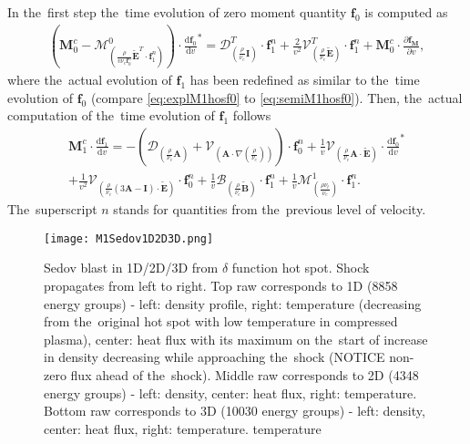 \documentclass[review]{elsarticle}
\newcommand{\pdv}[2]{\frac{\partial{#1}}{\partial{#2}}}
\newcommand{\vect}[1]{\boldsymbol{#1}}
\newcommand{\matr}[1]{\mathbf{#1}}
\newcommand{\dI}{\text{d}}
\newcommand{\odv}[2]{\frac{\dI #1}{\dI #2}}
\newcommand{\ddv}[2]{\odv{#1}{#2}}
\newcommand{\nue}{\nu_{e}}
\newcommand{\nutot}{\nu_{t}}
\newcommand{\vmag}{v}
\newcommand{\tE}{\vect{\tilde{E}}}
\newcommand{\tB}{\vect{\tilde{B}}}
\newcommand{\fM}{f_M}
\newcommand{\vfzero}{\vect{f}_0}
\newcommand{\fone}{\vect{f}_1}
\newcommand{\MI}{\matr{I}}
\newcommand{\MA}{\matr{A}}
\newcommand{\IM}{\boldsymbol{\mathcal{M}}}
\newcommand{\ID}{\boldsymbol{\mathcal{D}}}
\newcommand{\IV}{\boldsymbol{\mathcal{V}}}
\newcommand{\IB}{\boldsymbol{\mathcal{B}}}
\begin{document}
In the~first step the~time evolution of zero moment quantity $\vfzero$ is 
computed as
\begin{multline}
  \left( \matr{M}^c_0 
  - \IM^0_{\left(\frac{\rho}{\vmag\nue\vfzero^n}\tE^T\cdot\fone^n\right)}
  \right) \cdot {\ddv{\vfzero}{\vmag}}^* 
  = 
  \ID^T_{\left(\frac{\rho}{\nue}\MI\right)} \cdot \fone^n 
  + \frac{2}{\vmag^2}\IV^T_{\left(\frac{\rho}{\nue}\tE\right)} \cdot \fone^n
  + \matr{M}^c_0 \cdot \pdv{\vect{\fM}}{\vmag} ,  
  \label{eq:explM1hosf0}
\end{multline}
where the~actual evolution of $\fone$ has been redefined as similar to 
the~time evolution of $\vfzero$ (compare \eqref{eq:explM1hosf0} to 
\eqref{eq:semiM1hosf0}). Then, the~actual computation of the~time evolution 
of $\fone$ follows
\begin{multline}
  \matr{M}^c_1 \cdot \ddv{\fone}{\vmag} 
  = 
  - \left(\ID_{\left(\frac{\rho}{\nue}\MA\right)}  
  + \IV_{\left( \MA \cdot \nabla\left(\frac{\rho}{\nue}\right) \right)} \right) 
  \cdot \vfzero^n  
  + \frac{1}{\vmag}\IV_{\left(\frac{\rho}{\nue}\MA \cdot \tE\right)} \cdot
  {\ddv{\vfzero}{\vmag}}^* \\
  + \frac{1}{\vmag^2}\IV_{\left(\frac{\rho}{\nue} 
  \left( 3\MA - \MI \right) \cdot \tE \right)} \cdot \vfzero^n
  + \frac{1}{\vmag}\IB_{\left( \frac{\rho}{\nue}\tB \right)} \cdot \fone^n
  + \frac{1}{\vmag}\IM^1_{\left( \frac{\rho \nutot}{\nue} \right)} 
  \cdot \fone^n .
  \label{eq:explM1hosf1}
\end{multline}
The~superscript $n$ stands for quantities from the~previous level of velocity.

\begin{figure}[tbh]
  \begin{center}
      \texttt{[image: M1Sedov1D2D3D.png]}
  \caption{
  Sedov blast in 1D/2D/3D from $\delta$ function hot spot. 
  Shock propagates from left to right. Top raw corresponds to 1D 
  (8858 energy groups) - 
  left: density profile, right: temperature 
  (decreasing from the~original hot spot with low temperature in compressed 
  plasma), center: heat flux with its maximum on the~start of increase 
  in density decreasing while approaching the~shock 
  (NOTICE non-zero flux ahead of the~shock). 
  Middle raw corresponds to 2D (4348 energy groups) - 
  left: density, center: heat flux, right: temperature.
  Bottom raw corresponds to 3D (10030 energy groups) - 
  left: density, center: heat flux, right: temperature.
  temperature 
  }
  \end{center}
  \label{fig:expl1D2D3D}
\end{figure}
\end{document}
